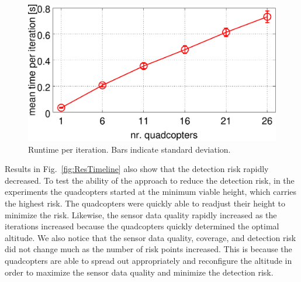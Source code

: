 \documentclass[letterpaper, 10pt, conference]{ieeeconf}
\begin{document}
\begin{figure}
\centering
\includegraphics[width=0.8\columnwidth]{figResTimePerIter}
\caption{Runtime per iteration. Bars indicate standard deviation.}
\label{table:TimeIter}
\end{figure}

Results in Fig.~\ref{fig:ResTimeline} also show that the detection
risk rapidly decreased.  To test the ability of the approach to reduce
the detection risk, in the experiments the quadcopters started at the
minimum viable height, which carries the highest risk. The quadcopters
were quickly able to readjust their height to minimize the risk.
Likewise, the sensor data quality rapidly increased as the iterations
increased because the quadcopters quickly determined the optimal
altitude.  We also notice that the sensor data quality, coverage,
and detection risk did not change much as the number of risk points
increased. This is because the quadcopters are able to spread out
appropriately and reconfigure the altitude in order to maximize the
sensor data quality and minimize the detection risk.
\end{document}
